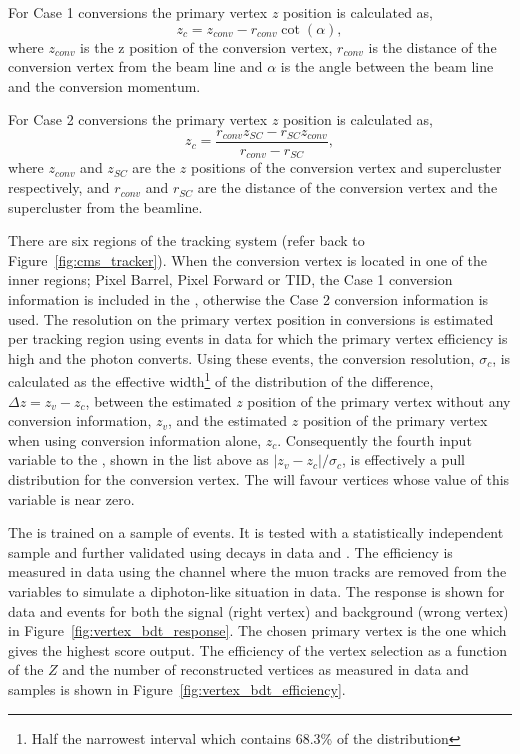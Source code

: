 For Case 1 conversions the primary vertex $z$ position is calculated as,
\begin{equation}
  z_{c} = z_{conv} - r_{conv}\cot(\alpha),
\end{equation}
where $z_{conv}$ is the z position of the conversion vertex, $r_{conv}$ is the distance of the conversion vertex from the beam line and $\alpha$ is the angle between the beam line and the conversion momentum.

For Case 2 conversions the primary vertex $z$ position is calculated as,
\begin{equation}
  z_{c} = \frac{r_{conv}z_{SC} - r_{SC}z_{conv}}{r_{conv} - r_{SC}},
\end{equation}
where $z_{conv}$ and $z_{SC}$ are the $z$ positions of the conversion vertex and supercluster respectively, and $r_{conv}$ and $r_{SC}$ are the distance of the conversion vertex and the supercluster from the beamline.

There are six regions of the tracking system (refer back to Figure~\ref{fig:cms_tracker}). When the conversion vertex is located in one of the inner regions; Pixel Barrel, Pixel Forward or TID, the Case 1 
conversion information is included in the \BDT, otherwise the Case 2 conversion information is used. The resolution on the primary vertex position in conversions is estimated per tracking region using \gjet events in data for which the primary vertex efficiency is high and the photon converts. Using these events, the conversion resolution, $\sigma_{c}$, is calculated as the effective width\footnote{Half the narrowest interval which contains 68.3\% of the distribution} of the distribution of the difference, $\Delta z=z_{v}-z_{c}$, between the estimated $z$ position of the primary vertex without any conversion information, $z_{v}$, and the estimated $z$ position of the primary vertex when using conversion information alone, $z_{c}$. Consequently the fourth input variable to the \BDT, shown in the list above as $|z_{v}-z_{c}|/\sigma_{c}$, is effectively a pull distribution for the conversion vertex. The \BDT will favour vertices whose value of this variable is near zero.

The \BDT is trained on a sample of \Hgg \MC events. It is tested with a statistically independent sample and further validated using \Zmumu decays in data and \MC. The efficiency is measured in data using the \Zmumu channel where the muon tracks are removed from the \BDT variables to simulate a diphoton-like situation in data. The \BDT response is shown for \Zmumu data and \MC events for both the signal (right vertex) and background (wrong vertex) in Figure~\ref{fig:vertex_bdt_response}. The chosen primary vertex is the one which gives the highest score \BDT output. The efficiency of the vertex selection as a function of the $Z$ \pT and the number of reconstructed vertices as measured in \Zmumu data and \MC samples is shown in Figure~\ref{fig:vertex_bdt_efficiency}. 

